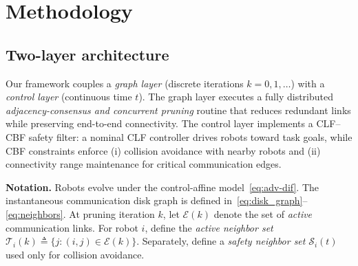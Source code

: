 \documentclass[conference]{IEEEconf}
\theoremstyle{plain}
\begin{document}





\section{Methodology}
\label{sec:method}

\subsection{Two-layer architecture}
Our framework couples a \emph{graph layer} (discrete iterations $k=0,1,\dots$) with a \emph{control layer} (continuous time $t$).
The graph layer executes a fully distributed \emph{adjacency-consensus and concurrent pruning} routine that reduces redundant links while preserving end-to-end connectivity.
The control layer implements a CLF--CBF safety filter: a nominal CLF controller drives robots toward task goals, while CBF constraints enforce (i) collision avoidance with nearby robots and (ii) connectivity range maintenance for critical communication edges.

\vspace{0.25em}
\noindent
\textbf{Notation.}
Robots evolve under the control-affine model~\eqref{eq:adv-dif}.
The instantaneous communication disk graph is defined in~\eqref{eq:disk_graph}--\eqref{eq:neighbors}.
At pruning iteration $k$, let $\mathcal{E}(k)$ denote the set of \emph{active} communication links.
For robot $i$, define the \emph{active neighbor set} $\mathcal{T}_i(k)\triangleq \{j:(i,j)\in \mathcal{E}(k)\}$.
Separately, define a \emph{safety neighbor set} $\mathcal{S}_i(t)$  used only for collision avoidance.
\end{document}
